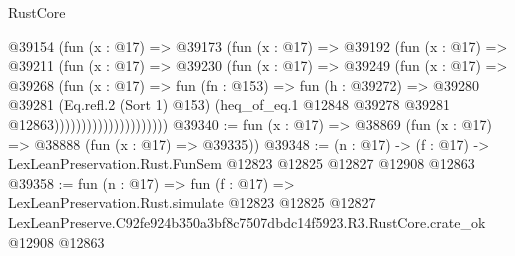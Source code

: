\begin{lexlean}{RustCore}
\begin{coremodule}
                            @39154
                              (fun (x : @17) =>
                              @39173
                                (fun (x : @17) =>
                                @39192
                                  (fun (x : @17) =>
                                  @39211
                                    (fun (x : @17) =>
                                    @39230
                                      (fun (x : @17) =>
                                      @39249
                                        (fun (x : @17) =>
                                        @39268
                                          (fun (x : @17) =>
                                          fun (fn : @153) =>
                                          fun (h : @39272) =>
                                          @39280
                                            @39281
                                            (Eq.refl.{2} (Sort 1) @153)
                                            (heq_of_eq.{1}
                                              @12848
                                              @39278
                                              @39281
                                              @12863)))))))))))))))))))))
@39340 := fun (x : @17) => @38869 (fun (x : @17) => @38888 (fun (x : @17) => @39335))
@39348 := (n : @17) ->
  (f : @17) -> LexLeanPreservation.Rust.FunSem @12823 @12825 @12827 @12908 @12863
@39358 := fun (n : @17) =>
  fun (f : @17) =>
  LexLeanPreservation.Rust.simulate
    @12823
    @12825
    @12827
    LexLeanPreserve.C92fe924b350a3bf8c7507dbdc14f5923.R3.RustCore.crate_ok
    @12908
    @12863
\end{coremodule}
\end{lexlean}

